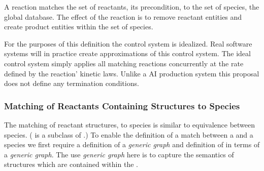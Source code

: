 \documentclass{cekarticle}
\begin{document}
A reaction matches
the set of reactants, its precondition, to the set of species, the global database.  The effect of the
reaction is to remove reactant entities and create product entities within the set of species.

For the purposes of this definition the control system is
idealized. Real software systems will in practice create
approximations of this control system.  The ideal control system
simply applies all matching reactions concurrently at the rate
defined by the reaction' kinetic laws.  Unlike a AI production
system this proposal does not define any termination conditions.

\subsubsection{Matching of Reactants Containing  Structures to Species}

The matching of reactant  structures, to
species is similar to equivalence between species.
( is a subclass of
.)  To enable the definition of a
match between a  and a species we first
require a definition of a \emph{generic graph} and definition of
 in terms of a \emph{generic graph}. The
use \emph{generic graph} here is to capture the semantics of
 structures which are contained within the
.
\end{document}
